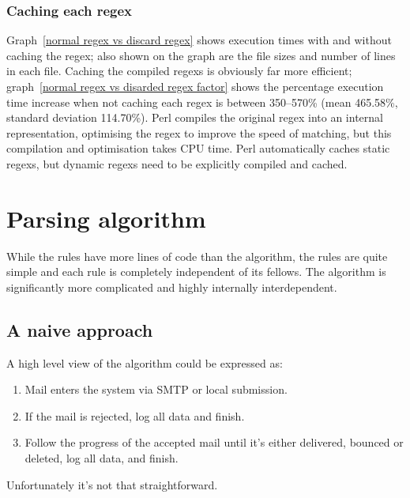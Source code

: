 \documentclass[a4paper,12pt,draft]{article}
\begin{document}
\subsubsection{Caching each regex}

Graph~\ref{normal regex vs discard regex} shows execution times with and
without caching the regex; also shown on the graph are the file sizes and
number of lines in each file.  Caching the compiled regexs is obviously far
more efficient; graph~\ref{normal regex vs disarded regex factor} shows the
percentage execution time increase when not caching each regex is between
350--570\% (mean 465.58\%, standard deviation 114.70\%).  Perl compiles the
original regex into an internal representation, optimising the regex to
improve the speed of matching, but this compilation and optimisation takes
CPU time.  Perl automatically caches static regexs, but dynamic regexs need
to be explicitly compiled and cached.


\section{Parsing algorithm}

\label{parsing-algorithm}

While the rules have more lines of code than the algorithm, the rules are
quite simple and each rule is completely independent of its fellows.  The
algorithm is significantly more complicated and highly internally
interdependent.


\subsection{A naive approach}

A high level view of the algorithm could be expressed as:

\begin{enumerate}

    \item Mail enters the system via SMTP or local submission.

    \item If the mail is rejected, log all data and finish.

    \item Follow the progress of the accepted mail until it's either
        delivered, bounced or deleted, log all data, and finish.

\end{enumerate}

Unfortunately it's not that straightforward.
\end{document}
